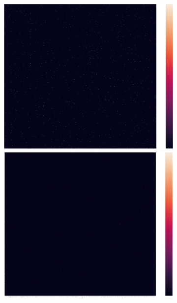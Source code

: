 \documentclass[12pt,%
               a4paper,%
               oneside,openany,%
               titlepage,%
               headinclude,footinclude,%
               BCOR5mm,%
               cleardoublepage=empty,%
               tablecaptionabove,%
               floatperchapter,
               ]{scrreprt}                 %
\begin{document}
\begin{figure}[ht]
\begin{minipage}[b]{0.5\linewidth}
\begin{figure}[ht]
\begin{minipage}[b]{0.5\linewidth}
\centering
\includegraphics[width=.9\linewidth]{Figures/Matrix_rareearth.jpg}
\vspace{4ex}
\end{minipage}
  \begin{minipage}[b]{0.5\linewidth}
    \centering
    \includegraphics[width=.9\linewidth]{Figures/Matrix_afghanistan.jpg}
    \vspace{4ex}
  \end{minipage} \\

\end{figure}
\end{minipage}
\end{figure}
\end{document}
